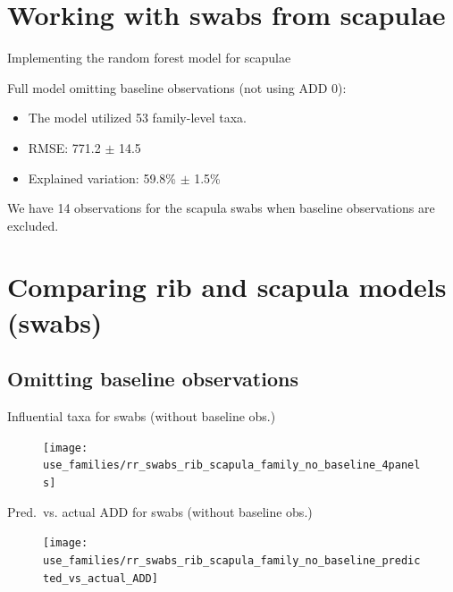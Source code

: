 \documentclass{beamer}
\begin{document}
\section[Scapula swabs]{Working with swabs from scapulae}

\begin{frame}{Implementing the random forest model for scapulae}

  \noindent Full model omitting baseline observations (not using ADD 0):
  \begin{itemize}
    \item The model utilized 53 family-level taxa.
    \item RMSE: 771.2 $\pm$ 14.5
    \item Explained variation: 59.8\% $\pm$ 1.5\%\\
  \end{itemize}

  \vspace{0.1in}

  \noindent We have 14 observations for the scapula swabs when baseline
  observations are excluded.

\end{frame}



\section[Swabs from ribs and scapulae]{Comparing rib and scapula models (swabs)}


\subsection[No baseline]{Omitting baseline observations}

\begin{frame}{Influential taxa for swabs (without baseline obs.)}

  \begin{center}
    \begin{figure}
      \texttt{[image: use\_families/rr\_swabs\_rib\_scapula\_family\_no\_baseline\_4panels]}
    \end{figure}
  \end{center}

\end{frame}


\begin{frame}{Pred.\ vs. actual ADD for swabs (without baseline obs.)}

  \begin{center}
    \begin{figure}
      \texttt{[image: use\_families/rr\_swabs\_rib\_scapula\_family\_no\_baseline\_predicted\_vs\_actual\_ADD]}
    \end{figure}
  \end{center}

\end{frame}
\end{document}
